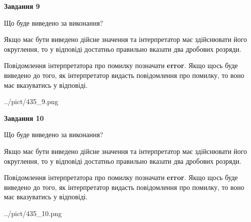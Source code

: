 \documentclass[12pt, ukrainian]{article}
\begin{document}
{\begin {Large}
{\begin {center}\textbf{Завдання 9}\end {center}}\par
Що буде виведено за виконання? \par

Якщо має бути виведено дійсне значення та інтерпретатор має здійснювати його округлення, 
то у відповіді достатньо правильно вказати два дробових розряди.

Повідомлення інтерпретатора про помилку позначати \textbf{error}.
Якщо щось буде виведено до того, як інтерпретатор видасть повідомлення про помилку, 
то воно має вказуватись у відповіді. \par

\begin{center}
	{../pict/435_9.png}
\end{center}
\newpage

{\begin {center}\textbf{Завдання 10}\end {center}}\par
Що буде виведено за виконання? \par

Якщо має бути виведено дійсне значення та інтерпретатор має здійснювати його округлення, 
то у відповіді достатньо правильно вказати два дробових розряди.

Повідомлення інтерпретатора про помилку позначати \textbf{error}.
Якщо щось буде виведено до того, як інтерпретатор видасть повідомлення про помилку, 
то воно має вказуватись у відповіді. \par

\begin{center}
	{../pict/435_10.png}
\end{center}
\newpage

\end {Large}}
\end{document}
